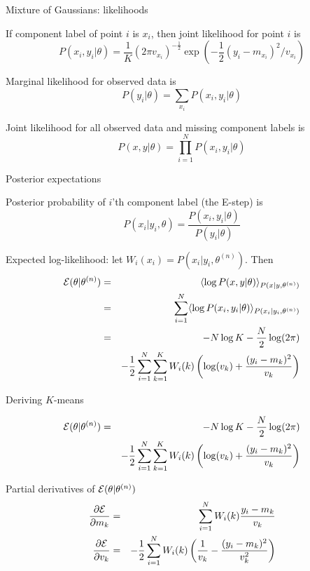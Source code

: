 \documentclass{beamer}
\begin{document}
\begin{frame}{Mixture of Gaussians: likelihoods}

\itemb
 \item If component label of point $i$ is $x_i$, then joint likelihood for point $i$ is
\[
P(x_i,y_i|\theta) = \frac{1}{K} (2\pi v_{x_i})^{-\frac{1}{2}} \exp(-\frac{1}{2}(y_i-m_{x_i})^2/v_{x_i})
\]
 \item Marginal likelihood for observed data is
\[
P(y_i|\theta) = \sum_{x_i} P(x_i,y_i|\theta)
\]
 \item Joint likelihood for all observed data and missing component labels is
\[
P(x,y|\theta) = \prod_{i=1}^N P(x_i,y_i|\theta)
\]
\iteme

\end{frame}

\begin{frame}{Posterior expectations}

\itemb
 \item Posterior probability of $i$'th component label (the E-step) is
\[
P(x_i|y_i,\theta) = \frac{P(x_i,y_i|\theta)}{P(y_i|\theta)}
\]
 \item Expected log-likelihood: let $W_i(x_i) = P(x_i|y_i,\theta^{(n)})$. Then
\begin{eqnarray*}
{\cal E}(\theta|\theta^{(n)}) & = & \langle \log P(x,y|\theta) \rangle_{P(x|y,\theta^{(n)})} \\
& = & \sum_{i=1}^N \langle \log P(x_i,y_i|\theta) \rangle_{P(x_i|y_i,\theta^{(n)})} \\
& = & -N \log K - \frac{N}{2} \log (2\pi) \\
& & - \frac{1}{2} \sum_{i=1}^N \sum_{k=1}^K W_i(k) \left( \log (v_k) + \frac{(y_i-m_k)^2}{v_k} \right) \\
\end{eqnarray*}
\iteme
\end{frame}

\begin{frame}{Deriving $K$-means}

\begin{eqnarray*}
{\cal E}(\theta|\theta^{(n)}) & = &  -N \log K - \frac{N}{2} \log (2\pi) \\
& & - \frac{1}{2} \sum_{i=1}^N \sum_{k=1}^K W_i(k) \left( \log (v_k) + \frac{(y_i-m_k)^2}{v_k} \right) \\
\end{eqnarray*}

Partial derivatives of ${\cal E}(\theta|\theta^{(n)})$
\begin{eqnarray*}
\frac{\partial {{\cal E}}}{\partial {m_k}} & = & \sum_{i=1}^N W_i(k) \frac{y_i - m_k}{v_k} \\
\frac{\partial {{\cal E}}}{\partial {v_k}} & = & -\frac{1}{2} \sum_{i=1}^N W_i(k) \left( \frac{1}{v_k} - \frac{(y_i-m_k)^2}{v_k^2} \right)
\end{eqnarray*}

\end{frame}
\end{document}
